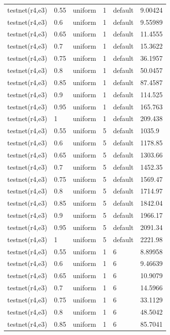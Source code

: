 \begin{longtable}[H]{llllll}
testnet(r4,e3) & 0.55 & uniform & 1 & default & 9.00424 \\
testnet(r4,e3) & 0.6  & uniform & 1 & default & 9.55989 \\
testnet(r4,e3) & 0.65 & uniform & 1 & default & 11.4555 \\
testnet(r4,e3) & 0.7  & uniform & 1 & default & 15.3622 \\
testnet(r4,e3) & 0.75 & uniform & 1 & default & 36.1957 \\
testnet(r4,e3) & 0.8  & uniform & 1 & default & 50.0457 \\
testnet(r4,e3) & 0.85 & uniform & 1 & default & 87.4587 \\
testnet(r4,e3) & 0.9  & uniform & 1 & default & 114.525 \\
testnet(r4,e3) & 0.95 & uniform & 1 & default & 165.763 \\
testnet(r4,e3) & 1    & uniform & 1 & default & 209.438 \\ \hline
testnet(r4,e3) & 0.55 & uniform & 5 & default & 1035.9  \\
testnet(r4,e3) & 0.6  & uniform & 5 & default & 1178.85 \\
testnet(r4,e3) & 0.65 & uniform & 5 & default & 1303.66 \\
testnet(r4,e3) & 0.7  & uniform & 5 & default & 1452.35 \\
testnet(r4,e3) & 0.75 & uniform & 5 & default & 1569.47 \\
testnet(r4,e3) & 0.8  & uniform & 5 & default & 1714.97 \\
testnet(r4,e3) & 0.85 & uniform & 5 & default & 1842.04 \\
testnet(r4,e3) & 0.9  & uniform & 5 & default & 1966.17 \\
testnet(r4,e3) & 0.95 & uniform & 5 & default & 2091.34 \\
testnet(r4,e3) & 1    & uniform & 5 & default & 2221.98 \\ \hline
testnet(r4,e3) & 0.55 & uniform & 1 & 6       & 8.89958 \\
testnet(r4,e3) & 0.6  & uniform & 1 & 6       & 9.46639 \\
testnet(r4,e3) & 0.65 & uniform & 1 & 6       & 10.9079 \\
testnet(r4,e3) & 0.7  & uniform & 1 & 6       & 14.5966 \\
testnet(r4,e3) & 0.75 & uniform & 1 & 6       & 33.1129 \\
testnet(r4,e3) & 0.8  & uniform & 1 & 6       & 48.5042 \\
testnet(r4,e3) & 0.85 & uniform & 1 & 6       & 85.7041 \\

\end{longtable}
